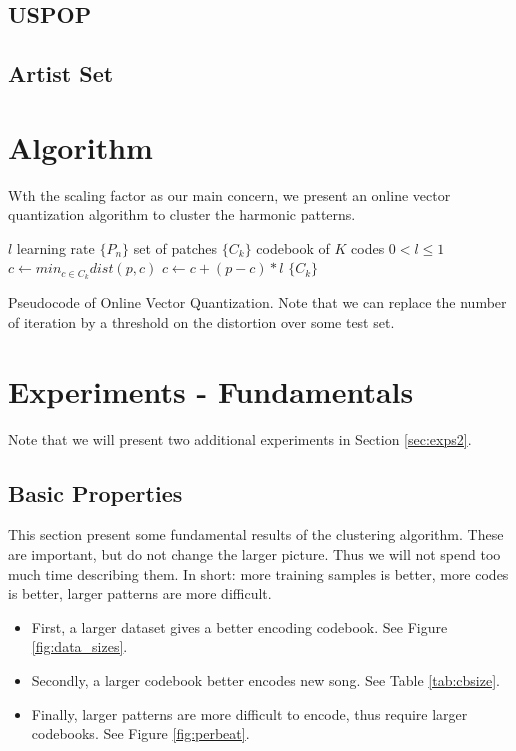 \documentclass{article}
\begin{document}
\subsection{USPOP}


\subsection{Artist Set}



\section{Algorithm}
Wth the scaling factor as our main concern, we present an online
vector quantization algorithm to cluster the harmonic patterns.

\begin{algorithm}
\begin{algorithmic}
\STATE$l$ learning rate
\STATE$\{P_n\}$ set of patches
\STATE$\{C_k\}$ codebook of $K$ codes
\REQUIRE $0 < l \leq 1$
\STATE$c \leftarrow min_{c \in C_k} dist(p,c)$
\STATE$c \leftarrow c + (p - c) * l$
\ENDFOR
\ENDFOR
\RETURN $\{C_k\}$
\caption{\small{Pseudocode of Online Vector Quantization. Note that we can 
replace the number of iteration by a threshold on the distortion over some 
test set.}
\label{algo:vq}}
\end{algorithmic}
\end{algorithm}



\section{Experiments - Fundamentals}\label{sec:experiments}
Note that we will present two additional experiments in 
Section \ref{sec:exps2}.

\subsection{Basic Properties}
This section present some fundamental results of the clustering algorithm.
These are important, but do not change the larger picture. Thus we will not
spend too much time describing them. In short: more training samples is
better, more codes is better, larger patterns are more difficult.
\begin{itemize}
\item First, a larger dataset gives a better encoding codebook. See Figure
\ref{fig:data_sizes}.
\item Secondly, a larger codebook better encodes new song. See 
Table \ref{tab:cbsize}.
\item Finally, larger patterns are more difficult to encode, thus require
larger codebooks. See Figure \ref{fig:perbeat}.
\end{itemize}
\end{document}
